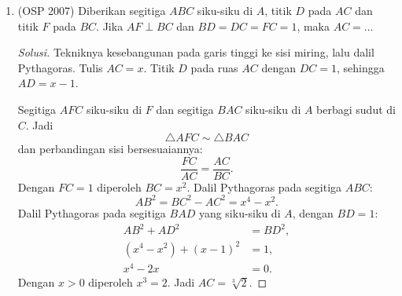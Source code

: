 \documentclass[12pt]{scrartcl}
\begin{document}
\begin{enumerate}[resume]
\begin{proof}[Solusi]
	Kedua sudut sama dan keduanya di $(0^\circ, 180^\circ)$, sehingga
	tangennya sama:
	\[ \frac{2y}{x^2 + y^2 - 1} = \frac{2y}{2x - 1}. \]
	Dengan $y > 0$ diperoleh $x^2 + y^2 - 1 = 2x - 1$, yaitu
	\[ (x - 1)^2 + y^2 = 1. \]
	(Kasus kedua sudut $90^\circ$ memberi $x^2 + y^2 = 1$ dan
	$x = 1/2$, yang juga memenuhi persamaan ini.)
	Titik $A$ terletak pada lingkaran berpusat $C$ berjari-jari $1$.
	Karena $BC = 2$:
	\[ \frac{AC}{BC} = \frac12. \]
	\end{proof}

	\item (OSP 2007)
	Diberikan segitiga $ABC$ siku-siku di $A$, titik $D$ pada $AC$ dan
	titik $F$ pada $BC$. Jika $AF \perp BC$ dan $BD=DC=FC=1$, maka
	$AC=\dots$
\begin{center}
\end{center}
	\begin{proof}[Solusi]
	Tekniknya kesebangunan pada garis tinggi ke sisi miring, lalu
	dalil Pythagoras. Tulis $AC = x$. Titik $D$ pada ruas $AC$ dengan
	$DC = 1$, sehingga $AD = x - 1$.

	Segitiga $AFC$ siku-siku di $F$ dan segitiga $BAC$ siku-siku di
	$A$ berbagi sudut di $C$. Jadi
	\[ \triangle AFC \sim \triangle BAC \]
	dan perbandingan sisi bersesuaiannya:
	\[ \frac{FC}{AC} = \frac{AC}{BC}. \]
	Dengan $FC = 1$ diperoleh $BC = x^2$. Dalil Pythagoras pada
	segitiga $ABC$:
	\[ AB^2 = BC^2 - AC^2 = x^4 - x^2. \]
	Dalil Pythagoras pada segitiga $BAD$ yang siku-siku di $A$,
	dengan $BD = 1$:
	\begin{align*}
	AB^2 + AD^2 &= BD^2, \\
	(x^4 - x^2) + (x - 1)^2 &= 1, \\
	x^4 - 2x &= 0.
	\end{align*}
	Dengan $x > 0$ diperoleh $x^3 = 2$. Jadi
	$AC = \sqrt[3]{2}$.
	\end{proof}

\end{enumerate}
\end{document}
